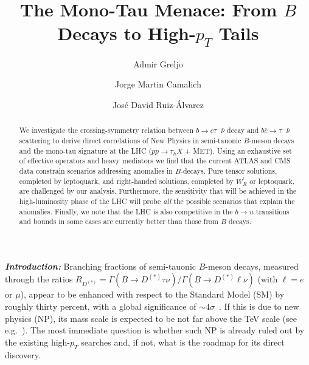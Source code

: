 \documentclass[%
 reprint,
 superscriptaddress,preprintnumbers,
 amsmath,amssymb,
 aps,
]{revtex4-1}
\begin{document}
\title{The Mono-Tau Menace: From $B$ Decays to High-$p_T$ Tails}

\author{Admir Greljo}
\author{Jorge Martin Camalich}
%
%
\author{Jos\'e David Ruiz-\'Alvarez}


\begin{abstract}

We investigate the crossing-symmetry relation between $b\to c\tau^-\bar\nu$ decay and $b\bar c\to \tau^-\bar\nu$ scattering to derive direct correlations of New Physics in semi-tauonic $B$-meson decays and the mono-tau signature at the LHC ($pp\to\tau_h X$ + MET). Using an exhaustive set of effective operators and heavy mediators we find that the current ATLAS and CMS data constrain scenarios addressing anomalies in $B$-decays. Pure tensor solutions, completed by leptoquark, and right-handed solutions, completed by $W^\prime_R$ or leptoquark, are challenged by our analysis. Furthermore, the sensitivity that will be achieved in the high-luminosity phase of the LHC will probe \textit{all} the possible scenarios that explain the anomalies. Finally, we note that the LHC is also competitive in the $b\to u$ transitions and bounds in some cases are currently better than those from $B$ decays.


\end{abstract}


\maketitle





\textit{\textbf{Introduction:}} Branching fractions of semi-tauonic $B$-meson decays, measured through the ratios $R_{D^{(*)}}=\Gamma(B\to D^{(*)}\tau\nu)/\Gamma(B\to D^{(*)}\ell\nu)$ (with $\ell=e$ or $\mu$), appear to be enhanced with respect to the Standard Model (SM) by roughly thirty percent, with a global significance of $\sim 4\sigma$~\cite{Lees:2012xj,Lees:2013uzd,Huschle:2015rga,Sato:2016svk,Aaij:2015yra,Hirose:2016wfn,Hirose:2017dxl,Aaij:2017uff,Aaij:2017deq,Aaij:2017tyk,Aoki:2016frl}. If this is due to new physics (NP), its mass scale is expected to be not far above the TeV scale (see e.g.~\cite{DiLuzio:2017chi}). The most immediate question is whether such NP is already ruled out by the existing high-$p_T$ searches and, if not, what is the roadmap for its direct discovery.
\end{document}
